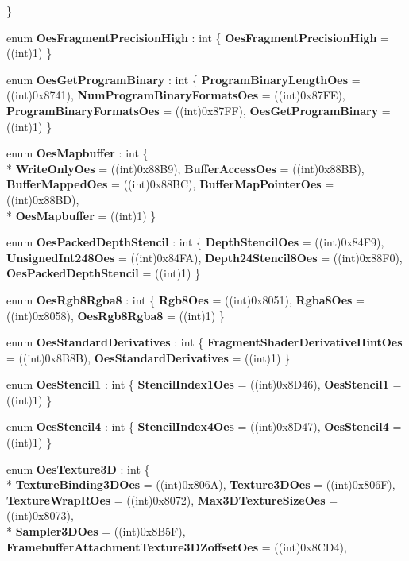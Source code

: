 \begin{DoxyCompactItemize}
 \}
\item 
enum {\bfseries Oes\-Fragment\-Precision\-High} \-: int \{ {\bfseries Oes\-Fragment\-Precision\-High} = ((int)1)
 \}
\item 
enum {\bfseries Oes\-Get\-Program\-Binary} \-: int \{ {\bfseries Program\-Binary\-Length\-Oes} = ((int)0x8741), 
{\bfseries Num\-Program\-Binary\-Formats\-Oes} = ((int)0x87\-F\-E), 
{\bfseries Program\-Binary\-Formats\-Oes} = ((int)0x87\-F\-F), 
{\bfseries Oes\-Get\-Program\-Binary} = ((int)1)
 \}
\item 
enum {\bfseries Oes\-Mapbuffer} \-: int \{ \\*
{\bfseries Write\-Only\-Oes} = ((int)0x88\-B9), 
{\bfseries Buffer\-Access\-Oes} = ((int)0x88\-B\-B), 
{\bfseries Buffer\-Mapped\-Oes} = ((int)0x88\-B\-C), 
{\bfseries Buffer\-Map\-Pointer\-Oes} = ((int)0x88\-B\-D), 
\\*
{\bfseries Oes\-Mapbuffer} = ((int)1)
 \}
\item 
enum {\bfseries Oes\-Packed\-Depth\-Stencil} \-: int \{ {\bfseries Depth\-Stencil\-Oes} = ((int)0x84\-F9), 
{\bfseries Unsigned\-Int248\-Oes} = ((int)0x84\-F\-A), 
{\bfseries Depth24\-Stencil8\-Oes} = ((int)0x88\-F0), 
{\bfseries Oes\-Packed\-Depth\-Stencil} = ((int)1)
 \}
\item 
enum {\bfseries Oes\-Rgb8\-Rgba8} \-: int \{ {\bfseries Rgb8\-Oes} = ((int)0x8051), 
{\bfseries Rgba8\-Oes} = ((int)0x8058), 
{\bfseries Oes\-Rgb8\-Rgba8} = ((int)1)
 \}
\item 
enum {\bfseries Oes\-Standard\-Derivatives} \-: int \{ {\bfseries Fragment\-Shader\-Derivative\-Hint\-Oes} = ((int)0x8\-B8\-B), 
{\bfseries Oes\-Standard\-Derivatives} = ((int)1)
 \}
\item 
enum {\bfseries Oes\-Stencil1} \-: int \{ {\bfseries Stencil\-Index1\-Oes} = ((int)0x8\-D46), 
{\bfseries Oes\-Stencil1} = ((int)1)
 \}
\item 
enum {\bfseries Oes\-Stencil4} \-: int \{ {\bfseries Stencil\-Index4\-Oes} = ((int)0x8\-D47), 
{\bfseries Oes\-Stencil4} = ((int)1)
 \}
\item 
enum {\bfseries Oes\-Texture3\-D} \-: int \{ \\*
{\bfseries Texture\-Binding3\-D\-Oes} = ((int)0x806\-A), 
{\bfseries Texture3\-D\-Oes} = ((int)0x806\-F), 
{\bfseries Texture\-Wrap\-R\-Oes} = ((int)0x8072), 
{\bfseries Max3\-D\-Texture\-Size\-Oes} = ((int)0x8073), 
\\*
{\bfseries Sampler3\-D\-Oes} = ((int)0x8\-B5\-F), 
{\bfseries Framebuffer\-Attachment\-Texture3\-D\-Zoffset\-Oes} = ((int)0x8\-C\-D4), 

\end{DoxyCompactItemize}
